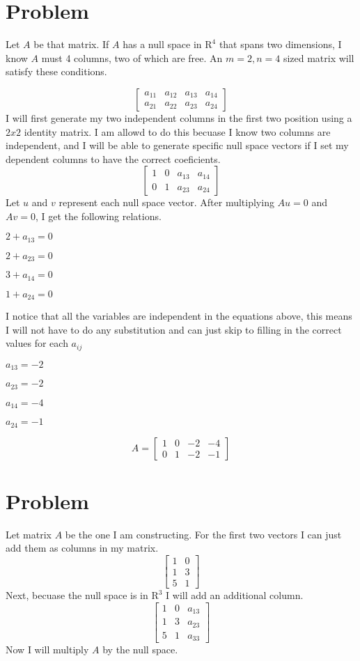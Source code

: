 \documentclass{article}
\begin{document}
\section{Problem}
Let $A$ be that matrix. If $A$ has a null space in $\textrm{R}^4$ that spans two dimensions, I know $A$ must 4 columns, two of which are free. An $m = 2, n = 4$ sized matrix will satisfy these conditions.

\[
\begin{bmatrix}
a_{11} & a_{12} & a_{13} & a_{14} \\
a_{21} & a_{22} & a_{23} & a_{24}
\end{bmatrix}
\]
I will first generate my two independent columns in the first two position using a $2x2$ identity matrix. I am allowd to do this becuase I know two columns are independent, and I will be able to generate specific null space vectors if I set my dependent columns to have the correct coeficients.
\[
\begin{bmatrix}
1 & 0 & a_{13} & a_{14} \\
0 & 1 & a_{23} & a_{24}
\end{bmatrix}
\]
Let $u$ and $v$ represent each null space vector. After multiplying $Au = 0$ and $Av = 0$, I get the following relations.

$2 + a_{13} = 0$

$2 + a_{23} = 0$

$3 + a_{14} = 0$

$1 + a_{24} = 0$

I notice that all the variables are independent in the equations above, this means I will not have to do any substitution and can just skip to filling in the correct values for each $a_{ij}$

$a_{13} = -2$

$a_{23} = -2$

$a_{14} = -4$

$a_{24} = -1$

\[
A = 
\begin{bmatrix}
1 & 0 & -2 & -4 \\
0 & 1 & -2 & -1
\end{bmatrix}
\]
\section{Problem}
Let matrix $A$ be the one I am constructing. For the first two vectors I can just add them as columns in my matrix.
\[
\begin{bmatrix}
1 & 0 \\
1 & 3 \\
5 & 1  
\end{bmatrix}
\]
Next, becuase the null space is in $\textrm{R}^{3}$ I will add an additional column.
\[
\begin{bmatrix}
1 & 0 & a_{13} \\
1 & 3 & a_{23} \\
5 & 1 & a_{33} 
\end{bmatrix}
\]
Now I will multiply $A$ by the null space.
\end{document}
